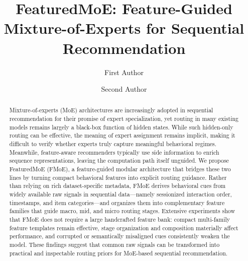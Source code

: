 \documentclass[sigconf,authordraft]{acmart}
\begin{document}
\title[FeaturedMoE for Sequential Recommendation]{FeaturedMoE: Feature-Guided Mixture-of-Experts for Sequential Recommendation}

\author{First Author}

\author{Second Author}

\renewcommand{\shortauthors}{Author et al.}

\begin{abstract}
Mixture-of-experts (MoE) architectures are increasingly adopted in sequential recommendation for their promise of expert specialization, yet routing in many existing models remains largely a black-box function of hidden states. While such hidden-only routing can be effective, the meaning of expert assignment remains implicit, making it difficult to verify whether experts truly capture meaningful behavioral regimes. Meanwhile, feature-aware recommenders typically use side information to enrich sequence representations, leaving the computation path itself unguided. We propose FeaturedMoE (FMoE), a feature-guided modular architecture that bridges these two lines by turning compact behavioral features into explicit routing guidance. Rather than relying on rich dataset-specific metadata, FMoE derives behavioral cues from widely available raw signals in sequential data---namely sessionized interaction order, timestamps, and item categories---and organizes them into complementary feature families that guide macro, mid, and micro routing stages. Extensive experiments show that FMoE does not require a large handcrafted feature bank: compact multi-family feature templates remain effective, stage organization and composition materially affect performance, and corrupted or semantically misaligned cues consistently weaken the model. These findings suggest that common raw signals can be transformed into practical and inspectable routing priors for MoE-based sequential recommendation.
\end{abstract}

\end{document}
